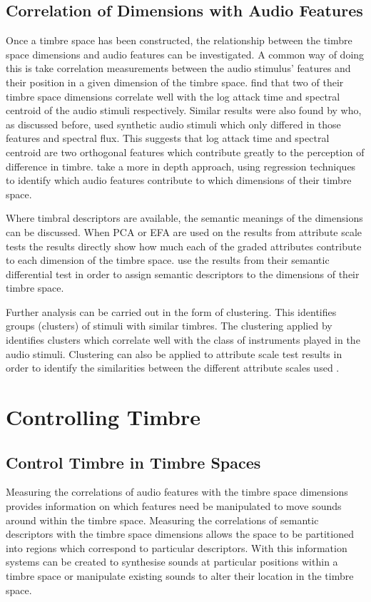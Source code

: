 	\subsection{Correlation of Dimensions with Audio Features}
	\label{sec:Timbre-DimensionalityReduction-DimensionCorrelations}
		Once a timbre space has been constructed, the relationship between the timbre space dimensions and audio
		features can be investigated. A common way of doing this is take correlation measurements between the audio
		stimulus' features and their position in a given dimension of the timbre space.
		\citet{mcadams1995perceptual} find that two of their timbre space dimensions correlate well with the log
		attack time and spectral centroid of the audio stimuli respectively. Similar results were also found by
		\citet{caclin2005acoustic} who, as discussed before, used synthetic audio stimuli which only differed in
		those features and spectral flux. This suggests that log attack time and spectral centroid are two
		orthogonal features which contribute greatly to the perception of difference in timbre.
		\citet{alluri2010exploring} take a more in depth approach, using regression techniques to identify which
		audio features contribute to which dimensions of their timbre space.

		Where timbral descriptors are available, the semantic meanings of the dimensions can be discussed. When PCA
		or EFA are used on the results from attribute scale tests the results directly show how much each of the
		graded attributes contribute to each dimension of the timbre space. \citet{marui2005timbre} use the results
		from their semantic differential test in order to assign semantic descriptors to the dimensions of their
		timbre space. 
		
		Further analysis can be carried out in the form of clustering. This identifies groups (clusters) of stimuli
		with similar timbres. The clustering applied by \citet{lakatos2000a} identifies clusters which correlate
		well with the class of instruments played in the audio stimuli. Clustering can also be applied to attribute
		scale test results in order to identify the similarities between the different attribute scales used
		\citep{zacharakis2011an2}.

\section{Controlling Timbre}
\label{sec:Timbre-Control}
	\subsection{Control Timbre in Timbre Spaces}
	\label{sec:Timbre-Control-TimbreSpaces}
		Measuring the correlations of audio features with the timbre space dimensions provides information on which
		features need be manipulated to move sounds around within the timbre space. Measuring the correlations of
		semantic descriptors with the timbre space dimensions allows the space to be partitioned into regions which
		correspond to particular descriptors. With this information systems can be created to synthesise sounds at
		particular positions within a timbre space or manipulate existing sounds to alter their location in the
		timbre space.

